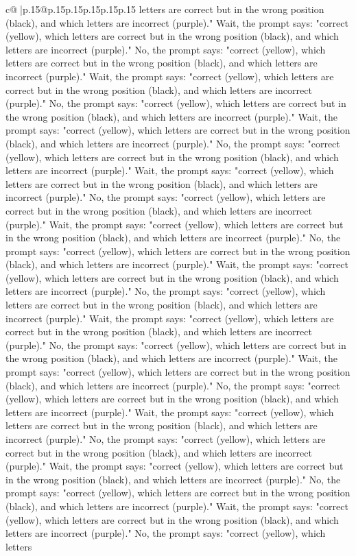 \documentclass{article}
\begin{document}
{\begin{supertabular}{c@{$\;$}|p{.15\linewidth}@{}p{.15\linewidth}p{.15\linewidth}p{.15\linewidth}p{.15\linewidth}p{.15\linewidth}}
{{{letters are correct but in the wrong position (black), and which letters are incorrect (purple)." Wait, the prompt says: "correct (yellow), which letters are correct but in the wrong position (black), and which letters are incorrect (purple)." No, the prompt says: "correct (yellow), which letters are correct but in the wrong position (black), and which letters are incorrect (purple)." Wait, the prompt says: "correct (yellow), which letters are correct but in the wrong position (black), and which letters are incorrect (purple)." No, the prompt says: "correct (yellow), which letters are correct but in the wrong position (black), and which letters are incorrect (purple)." Wait, the prompt says: "correct (yellow), which letters are correct but in the wrong position (black), and which letters are incorrect (purple)." No, the prompt says: "correct (yellow), which letters are correct but in the wrong position (black), and which letters are incorrect (purple)." Wait, the prompt says: "correct (yellow), which letters are correct but in the wrong position (black), and which letters are incorrect (purple)." No, the prompt says: "correct (yellow), which letters are correct but in the wrong position (black), and which letters are incorrect (purple)." Wait, the prompt says: "correct (yellow), which letters are correct but in the wrong position (black), and which letters are incorrect (purple)." No, the prompt says: "correct (yellow), which letters are correct but in the wrong position (black), and which letters are incorrect (purple)." Wait, the prompt says: "correct (yellow), which letters are correct but in the wrong position (black), and which letters are incorrect (purple)." No, the prompt says: "correct (yellow), which letters are correct but in the wrong position (black), and which letters are incorrect (purple)." Wait, the prompt says: "correct (yellow), which letters are correct but in the wrong position (black), and which letters are incorrect (purple)." No, the prompt says: "correct (yellow), which letters are correct but in the wrong position (black), and which letters are incorrect (purple)." Wait, the prompt says: "correct (yellow), which letters are correct but in the wrong position (black), and which letters are incorrect (purple)." No, the prompt says: "correct (yellow), which letters are correct but in the wrong position (black), and which letters are incorrect (purple)." Wait, the prompt says: "correct (yellow), which letters are correct but in the wrong position (black), and which letters are incorrect (purple)." No, the prompt says: "correct (yellow), which letters are correct but in the wrong position (black), and which letters are incorrect (purple)." Wait, the prompt says: "correct (yellow), which letters are correct but in the wrong position (black), and which letters are incorrect (purple)." No, the prompt says: "correct (yellow), which letters are correct but in the wrong position (black), and which letters are incorrect (purple)." Wait, the prompt says: "correct (yellow), which letters are correct but in the wrong position (black), and which letters are incorrect (purple)." No, the prompt says: "correct (yellow), which letters }}}
\end{supertabular}}
\end{document}
